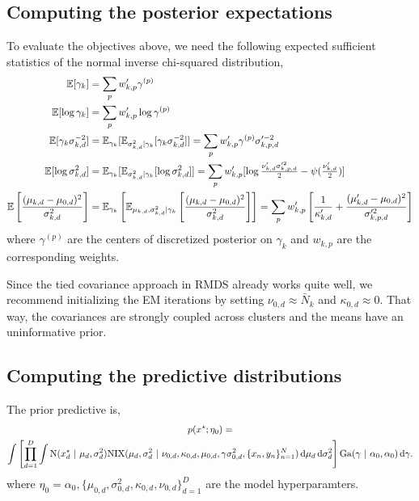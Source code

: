 \subsection{Computing the posterior expectations}
To evaluate the objectives above, we need the following expected sufficient statistics of the normal inverse chi-squared distribution,
\begin{align*}
    \mathbb{E}[\gamma_k] &= \sum_p w_{k,p}' \gamma^{(p)} \\
    \mathbb{E}[\log \gamma_k] &= \sum_p w_{k,p}' \log \gamma^{(p)} \\
    \mathbb{E}[\gamma_k \sigma_{k,d}^{-2}] &= \mathbb{E}_{\gamma_k} [ \mathbb{E}_{\sigma_{k,d}^2 | \gamma_k} [\gamma_k \sigma_{k,d}^{-2}]]
    = \sum_p w_{k,p}' \gamma^{(p)} \sigma_{k,p,d}'^{-2} \\
    \mathbb{E}[\log \sigma_{k,d}^2] &=
    \mathbb{E}_{\gamma_k} [\mathbb{E}_{\sigma_{k,d}^2 | \gamma_k} [\log \sigma_{k,d}^2]]
    = \sum_p w_{k,p}' [\log \tfrac{\nu_{k,d}' \sigma_{k,p,d}'^2}{2} - \psi(\tfrac{\nu_{k,d}'}{2})] \\
    \mathbb{E} \left[\frac{(\mu_{k,d} - \mu_{0,d})^2}{\sigma_{k,d}^2}\right]
    &= \mathbb{E}_{\gamma_k} \left[\mathbb{E}_{\mu_{k,d}, \sigma_{k,d}^2 | \gamma_k} \left[\frac{(\mu_{k,d} -    \mu_{0,d})^2}{\sigma_{k,d}^2}\right] \right]
    = \sum_p w_{k,p}' \left[\frac{1}{\kappa_{k,d}'} +  \frac{(\mu_{k,d}' - \mu_{0,d})^2}{\sigma_{k,p,d}'^2} \right]
\end{align*}
where $\gamma^{(p)}$ are the centers of discretized posterior on $\gamma_k$ and $w_{k,p}$ are the corresponding weights.

Since the tied covariance approach in RMDS already works quite well, we recommend initializing the EM iterations by setting $\nu_{0,d} \approx \bar{N}_k$ and $\kappa_{0,d} \approx 0$. That way, the covariances are strongly coupled across clusters and the means have an uninformative prior.


\subsection{Computing the predictive distributions}
The prior predictive is,
\begin{multline*}
    p(x^\star; \eta_0) = \\
    \int  \left[\prod_{d=1}^D \int \mathrm{N}(x^\star_d ~\vert~ \mu_d, \sigma^2_d)
        \mathrm{NIX}(\mu_d, \sigma^2_d ~\vert~ \nu_{0,d}, \kappa_{0,d}, \mu_{0,d}, \gamma \sigma^2_{0,d}, \{x_n, y_n\}_{n=1}^N)
        \mathop{}\!\mathrm{d} \mu_d \mathop{}\!\mathrm{d} \sigma^2_d \right] \mathrm{Ga}(\gamma ~\vert~ \alpha_0, \alpha_0) \mathop{}\!\mathrm{d} \gamma.
\end{multline*}
where $\eta_0 = \alpha_0, \{\mu_{0,d}, \sigma^2_{0,d}, \kappa_{0,d}, \nu_{0,d}\}_{d=1}^D$ are the model hyperparamters.

